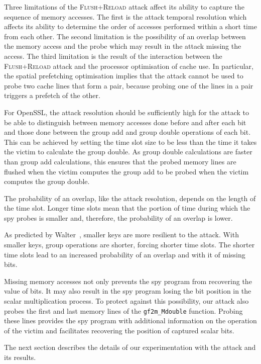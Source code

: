 \documentclass[twocolumn]{article}
\newcommand{\fl}{\textsc{Flu\-sh+\allowbreak Re\-load}\xspace}
\begin{document}
Three limitations of the \fl attack affect its ability to capture the sequence of memory accesses.
The first is the attack temporal resolution which affects its ability to 
determine the order of accesses performed within a short time from each other.
The second limitation is the possibility of an overlap between the memory access and the probe which may result
in the attack missing the access.
The third limitation is the result of the interaction between the \fl attack and the processor
optimisation of cache use.  
In particular, the spatial prefetching optimisation implies that the attack cannot be used to probe two cache lines that form a pair,
because probing one of the lines in a pair triggers a prefetch of the other.



For OpenSSL, the attack resolution should be sufficiently high for the attack to be able to distinguish between 
memory accesses done before and after each bit and those done between the group add and group double operations of each bit.
This can be achieved by setting the time slot size to be less than the time it takes the victim to calculate the group double.
As group double calculations are faster than group add calculations, this ensures that the probed memory lines are flushed
when the victim computes the group add to be probed when the victim computes the group double.

The probability of an overlap, like the attack resolution, depends on the length of the time slot.
Longer time slots mean that the portion of time during which the spy probes is smaller and, therefore, 
the probability of an overlap is lower.

As predicted by Walter~\cite{walter04longer}, smaller keys are more resilient to the attack.
With smaller keys, group operations are shorter, forcing shorter time slots.
The shorter time slots lead to an increased probability of an overlap and with it of missing bits.

Missing memory accesses not only prevents the spy program from recovering the value of bits.
It may also result in the spy program losing the bit position in the scalar multiplication process.
To protect against this possibility, our attack also probes the first and last memory lines of the 
\texttt{gf2m\_Mdouble} function.
Probing these lines provides the spy program with additional information on the operation of the victim
and facilitates recovering the position of captured scalar bits.


The next section describes the details of our experimentation with the attack and its results.
\end{document}
